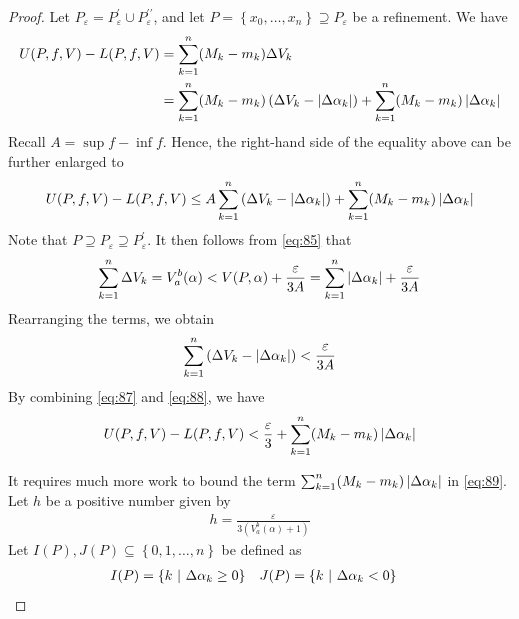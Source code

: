 \documentclass[thmcnt=section, 12pt]{my-elegantbook}
\begin{document}
\begin{proof}
    \par Let $P_\varepsilon = P^\prime_\varepsilon \cup P^{\prime\prime}_\varepsilon$, and let $P = \left\{x_0, \ldots, x_n\right\} \supseteq P_\varepsilon$ be a refinement. We have
    \begin{align*}
        U(P,f,V) - L(P,f,V)
         & = \sum_{k=1}^n (M_k - m_k) \Delta V_k                                       \\
         & = \sum_{k=1}^n (M_k - m_k) \left( \Delta V_k - \left\lvert \Delta\alpha_k \right\rvert \right)
        + \sum_{k=1}^n (M_k - m_k) \left\lvert \Delta\alpha_k \right\rvert
    \end{align*}
    Recall $A = \sup f - \inf f$. Hence, the right-hand side of the equality above can be further enlarged to
    \begin{align}
        U(P,f,V) - L(P,f,V)
        \leq A \sum_{k=1}^n \left( \Delta V_k - \left\lvert \Delta\alpha_k \right\rvert \right)
        + \sum_{k=1}^n (M_k - m_k) \left\lvert \Delta\alpha_k \right\rvert
        \label{eq:87}
    \end{align}
    Note that $P \supseteq P_\varepsilon \supseteq P^\prime_\varepsilon$. It then follows from \eqref{eq:85} that
    \begin{align*}
        \sum_{k=1}^n \Delta V_k
        = V_a^b(\alpha)
        < V(P, \alpha)
        + \frac{\varepsilon}{3A}
        = \sum_{k=1}^n \left\lvert \Delta\alpha_k \right\rvert
        + \frac{\varepsilon}{3A}
    \end{align*}
    Rearranging the terms, we obtain
    \begin{align}
        \sum_{k=1}^n \left( \Delta V_k - \left\lvert \Delta\alpha_k \right\rvert \right)
        < \frac{\varepsilon}{3A}
        \label{eq:88}
    \end{align}
    By combining \eqref{eq:87} and \eqref{eq:88}, we have
    \begin{align}
        U(P,f,V) - L(P,f,V)
        < \frac{\varepsilon}{3}
        + \sum_{k=1}^n (M_k - m_k) \left\lvert \Delta\alpha_k \right\rvert
        \label{eq:89}
    \end{align}

    It requires much more work to bound the term $\sum_{k=1}^n (M_k - m_k) \left\lvert \Delta\alpha_k \right\rvert$ in \eqref{eq:89}. Let $h$ be a positive number given by
    \begin{align*}
        h = \frac{\varepsilon}{3(V_a^b (\alpha) + 1)}
    \end{align*}
    Let $I(P), J(P) \subseteq \left\{0, 1, \ldots, n\right\}$ be defined as
    \begin{align*}
        I(P) & = \left\{ k \ \middle| \ \Delta\alpha_k \geq 0 \right\} &
        J(P) & = \left\{ k \ \middle| \ \Delta\alpha_k < 0 \right\}
    \end{align*}


\end{proof}
\end{document}
